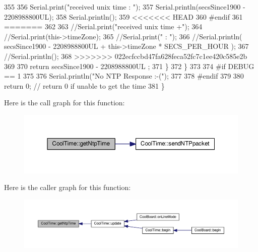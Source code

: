\begin{DoxyCode}
355     
356             Serial.print(\textcolor{stringliteral}{"received unix time : "});
357             Serial.println(secsSince1900 - 2208988800UL);
358             Serial.println();
359 <<<<<<< HEAD
360 \textcolor{preprocessor}{        #endif }
361 =======
362 
363             \textcolor{comment}{//Serial.print("received unix time +");}
364             \textcolor{comment}{//Serial.print(this->timeZone);}
365             \textcolor{comment}{//Serial.print(" : ");}
366             \textcolor{comment}{//Serial.println( secsSince1900 - 2208988800UL + this->timeZone * SECS\_PER\_HOUR );}
367             \textcolor{comment}{//Serial.println();}
368 >>>>>>> 022ecfccbd47fa628feca52fc7c1ee420c585e2b
369             
370             \textcolor{keywordflow}{return} secsSince1900 - 2208988800UL ;
371         \}
372     \}
373     
374 \textcolor{preprocessor}{#if DEBUG == 1}
375 
376     Serial.println(\textcolor{stringliteral}{"No NTP Response :-("});
377 
378 \textcolor{preprocessor}{#endif }
379 
380     \textcolor{keywordflow}{return} 0; \textcolor{comment}{// return 0 if unable to get the time}
381 \}
\end{DoxyCode}
Here is the call graph for this function\+:
\nopagebreak
\begin{figure}[H]
\begin{center}
\leavevmode
\includegraphics[width=350pt]{classCoolTime_a41fbbbfd651c2079f54d4b2911e4c705_cgraph}
\end{center}
\end{figure}
Here is the caller graph for this function\+:
\nopagebreak
\begin{figure}[H]
\begin{center}
\leavevmode
\includegraphics[width=350pt]{classCoolTime_a41fbbbfd651c2079f54d4b2911e4c705_icgraph}
\end{center}
\end{figure}
\mbox{\label{classCoolTime_a7a7501c5ca77dd1248bea704c44f986c}} 

